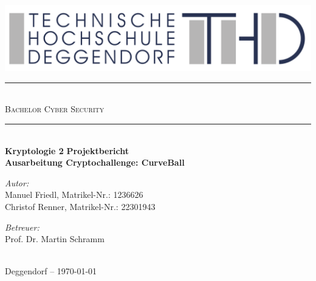 \documentclass{article}
\begin{document}
\begin{titlepage}
  \begin{center}
    \includegraphics[width=\textwidth]{THD-Logo.pdf}
    \vspace{1cm}
    \rule{1\textwidth}{1mm} \\[0.3cm]
    \textsc{\scshape \huge Bachelor Cyber Security}\\
    \rule{1\textwidth}{1mm} \\[2cm]
    {
      \vspace{1cm}
      \Large \textbf{Kryptologie 2}
      \vspace{3cm}
      \Large \textbf{Projektbericht}
    }\\[0.5cm]
    \LARGE \textbf{Ausarbeitung Cryptochallenge: CurveBall}\\[2cm]
    \begin{minipage}[t]{0.4\textwidth}
      \begin{flushleft}
        \normalsize \emph{Autor:}\\[0.3cm]
        Manuel Friedl, Matrikel-Nr.: 1236626\\
        Christof Renner, Matrikel-Nr.: 22301943
      \end{flushleft}
    \end{minipage}
    \begin{minipage}[t]{0.5\textwidth}
      \begin{flushright}
        \normalsize \emph{Betreuer:}\\[0.3cm]
        Prof. Dr. Martin Schramm
      \end{flushright}
    \end{minipage}\\[3cm]
    {\large Deggendorf – \today\\}
  \end{center}
\end{titlepage}

\newpage
{}

\newpage
\tableofcontents
\newpage

\end{document}
